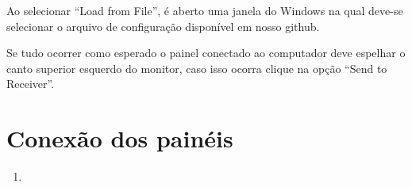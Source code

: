 \documentclass[12pt, a4paper]{article}
\begin{document}
Ao selecionar ``Load from File'', é aberto uma janela do Windows na qual deve-se selecionar o arquivo de configuração disponível em nosso github\cite{arquivoConfig}.

Se tudo ocorrer como esperado o painel conectado ao computador deve espelhar o canto superior esquerdo do monitor, caso isso ocorra clique na opção ``Send to Receiver''.

\cleardoublepage
\section{Conexão dos painéis}\label{Conexão dos painéis}
\begin{enumerate}
	\item 
\end{enumerate}

\cleardoublepage

\end{document}
